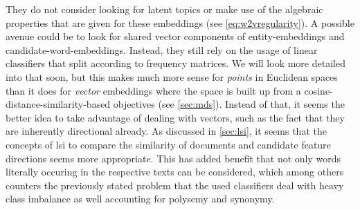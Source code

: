 
They do not consider looking for latent topics or make use of the algebraic properties that are given for these embeddings (see \autoref{eq:w2vregularity}). A possible avenue could be to look for shared vector components of entity-embeddings and candidate-word-embeddings. Instead, they still rely on the usage of linear classifiers that split according to frequency matrices. We will look more detailed into that soon, but this makes much more sense for \textit{points} in Euclidean spaces than it does for \textit{vector} embeddings where the space is built up from a cosine-distance-similarity-based objectives (see \autoref{sec:mds}). Instead of that, it seems the better idea to take advantage of dealing with vectors, such as the fact that they are inherently directional already. As discussed in \autoref{sec:lsi}, it seems that the concepts of \gls{lsi} to compare the similarity of documents and candidate feature directions seems more appropriate. This has added benefit that not only words literally occuring in the respective texts can be considered, which among others counters the previously stated problem that the used classifiers deal with heavy class imbalance as well accounting for polysemy and synonymy.

